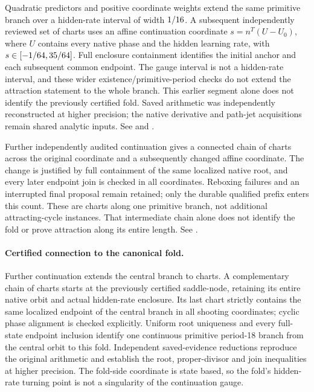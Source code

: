 \documentclass[11pt,letterpaper]{article}
\begin{document}
Quadratic predictors and positive coordinate weights extend the same primitive
branch over a hidden-rate interval of width $1/16$.
A subsequent independently reviewed set of \nArcReviewedCharts{} charts uses
an affine continuation coordinate
$s=n^T(U-U_0)$, where $U$ contains every native phase and the hidden learning
rate, with $s\in[-1/64, 35/64]$. Full enclosure containment identifies the
initial anchor and each subsequent common endpoint. The gauge interval is not
a hidden-rate interval, and these wider existence/primitive-period checks do
not extend the attraction statement to the whole branch. This earlier segment alone
does not identify the previously certified fold. Saved arithmetic was
independently reconstructed at higher precision; the native derivative and
path-jet acquisitions remain shared analytic inputs. See
 and
.

Further independently audited continuation gives a connected chain of
\nArcTotalReviewed{} charts across the original coordinate and a subsequently
changed affine coordinate. The change is justified by full containment of the
same localized native root, and every later endpoint join is checked in all
coordinates. Reboxing failures and an interrupted final proposal remain
retained; only the durable qualified prefix enters this count. These are
charts along one primitive branch, not additional attracting-cycle instances.
That intermediate chain alone does not identify the fold or prove attraction
along its entire length. See .

\paragraph{Certified connection to the canonical fold.}
Further continuation extends the central branch to \nFoldConnectedForward{}
charts. A complementary chain of \nFoldConnectedReverse{} charts starts at the
previously certified saddle-node, retaining its entire native orbit and actual
hidden-rate enclosure. Its last chart strictly contains the same localized
endpoint of the central branch in all shooting coordinates; cyclic phase
alignment is checked explicitly. Uniform root uniqueness and every full-state
endpoint inclusion identify one continuous primitive period-18 branch from the
central orbit to this fold. Independent saved-evidence reductions reproduce the
original arithmetic and establish the root, proper-divisor and join inequalities
at higher precision. The fold-side coordinate is state based, so the fold's
hidden-rate turning point is not a singularity of the continuation gauge.
\end{document}
